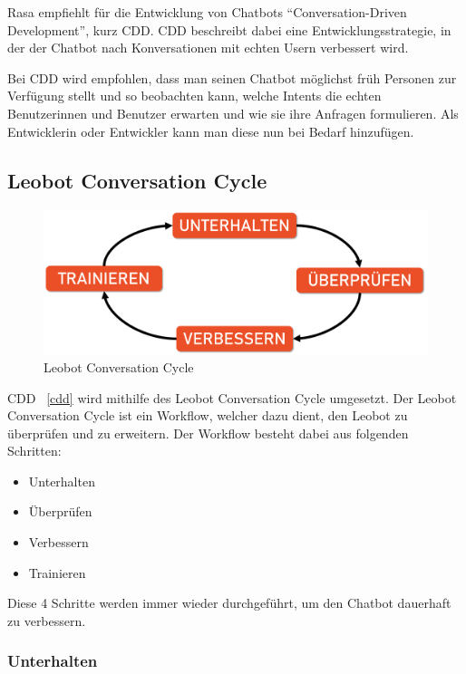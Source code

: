 Rasa empfiehlt für die Entwicklung von Chatbots ``Conversation-Driven Development'', kurz CDD.\cite{cdd}
CDD beschreibt dabei eine Entwicklungsstrategie, in der der Chatbot nach Konversationen mit echten Usern verbessert wird.

Bei CDD wird empfohlen, dass man seinen Chatbot möglichst früh Personen zur Verfügung stellt und so beobachten kann, welche Intents die echten Benutzerinnen und Benutzer erwarten und wie sie ihre Anfragen formulieren.
Als Entwicklerin oder Entwickler kann man diese nun bei Bedarf hinzufügen.


\subsection{Leobot Conversation Cycle}\label{subsec:leobot-conversation-cycle}

\begin{figure}[hbt!]
    \centering
    \includegraphics[scale=0.3]{pics/LeoCircle}
    \caption{Leobot Conversation Cycle}
    \label{fig:impl:ConversationCycle}
\end{figure}

CDD ~\ref{cdd} wird mithilfe des Leobot Conversation Cycle umgesetzt.
Der Leobot Conversation Cycle ist ein Workflow, welcher dazu dient, den Leobot zu überprüfen und zu erweitern.
Der Workflow besteht dabei aus folgenden Schritten:

\begin{itemize}
    \item Unterhalten
    \item Überprüfen
    \item Verbessern
    \item Trainieren
\end{itemize}

Diese 4 Schritte werden immer wieder durchgeführt, um den Chatbot dauerhaft zu verbessern.

\subsubsection{Unterhalten}

